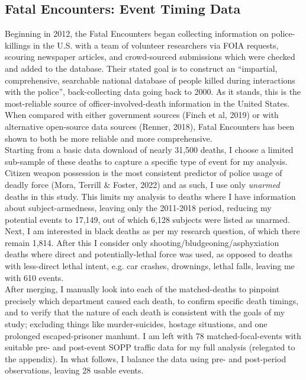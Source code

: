 \documentclass[12pt,a4paper]{article}
\begin{document}
\subsection{Fatal Encounters: Event Timing Data}
Beginning in 2012, the Fatal Encounters began collecting information on police-killings in the U.S. with a team of volunteer researchers via FOIA requests, scouring newspaper articles, and crowd-sourced submissions which were checked and added to the database. Their stated goal is to construct an ``impartial, comprehensive, searchable national database of people killed during interactions with the police'', back-collecting data going back to 2000. As it stands, this is the most-reliable source of officer-involved-death information in the United States. When compared with either government sources (Finch et al, 2019) or with alternative open-source data sources (Renner, 2018), Fatal Encounters has been shown to both be more reliable and more comprehensive. \\

Starting from a basic data download of nearly 31,500 deaths, I choose a limited sub-sample of these deaths to capture a specific type of event for my analysis. Citizen weapon possession is the most consistent predictor of police usage of deadly force (Mora, Terrill \& Foster, 2022) and as such, I use only \emph{unarmed} deaths in this study. This limits my analysis to deaths where I have information about subject-armedness, leaving only the 2011-2018 period, reducing my potential events to 17,149, out of which 6,128 subjects were listed as unarmed. Next, I am interested in black deaths as per my research question, of which there remain 1,814. After this I consider only shooting/bludgeoning/asphyxiation deaths where direct and potentially-lethal force was used, as opposed to deaths with less-direct lethal intent, e.g. car crashes, drownings, lethal falls, leaving me with 610 events. \\

After merging, I manually look into each of the matched-deaths to pinpoint precisely which department caused each death, to confirm specific death timings, and to verify that the nature of each death is consistent with the goals of my study; excluding things like murder-suicides, hostage situations, and one prolonged escaped-prisoner manhunt. I am left with 78 matched-focal-events with suitable pre- and post-event SOPP traffic data for my full analysis (relegated to the appendix). In what follows, I balance the data using pre- and post-period observations, leaving 28 usable events.  \\
\end{document}
